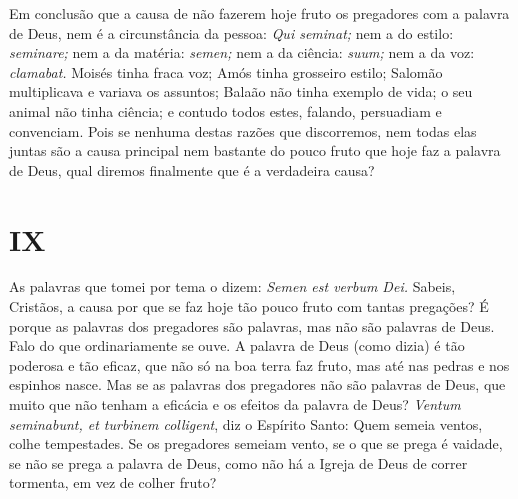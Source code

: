 Em conclusão que a causa de não fazerem hoje fruto os pregadores com a
palavra de Deus, nem é a circunstância da pessoa: \emph{Qui seminat;}
nem a do estilo: \emph{seminare;} nem a da matéria: \emph{semen;} nem a
da ciência: \emph{suum;} nem a da voz: \emph{clamabat.} Moisés tinha
fraca voz; Amós tinha grosseiro estilo; Salomão multiplicava e variava
os assuntos; Balaão não tinha exemplo de vida; o seu animal não tinha
ciência; e contudo todos estes, falando, persuadiam e convenciam. Pois
se nenhuma destas razões que discorremos, nem todas elas juntas são a
causa principal nem bastante do pouco fruto que hoje faz a palavra de
Deus, qual diremos finalmente que é a verdadeira causa?

\section{IX}

As palavras que tomei por tema o dizem: \emph{Semen est verbum Dei.}
Sabeis, Cristãos, a causa por que se faz hoje tão pouco fruto com tantas
pregações? É porque as palavras dos pregadores são palavras, mas
não são palavras de Deus. Falo do que ordinariamente se ouve. A palavra
de Deus (como dizia) é tão poderosa e tão eficaz, que não só na boa
terra faz fruto, mas até nas pedras e nos espinhos nasce. Mas se as
palavras dos pregadores não são palavras de Deus, que muito que não
tenham a eficácia e os efeitos da palavra de Deus? \emph{Ventum
seminabunt, et turbinem colligent}, diz o Espírito Santo: Quem
semeia ventos, colhe tempestades. Se os pregadores semeiam vento, se o
que se prega é vaidade, se não se prega a palavra de Deus, como não há a
Igreja de Deus de correr tormenta, em vez de colher fruto?

